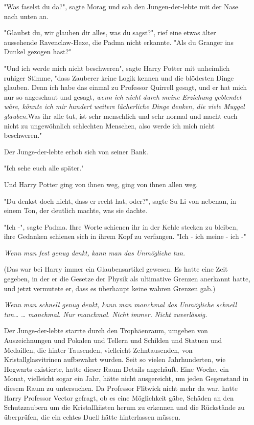 {"Was faselst du da?", sagte Morag und sah den Jungen-der-lebte mit der Nase nach unten an.

"Glaubst du, wir glauben dir alles, was du sagst?", rief eine etwas älter aussehende Ravenclaw-Hexe, die Padma nicht erkannte. "Als du Granger ins Dunkel gezogen hast?"

"Und ich werde mich nicht beschweren", sagte Harry Potter mit unheimlich ruhiger Stimme, "dass Zauberer keine Logik kennen und die blödesten Dinge glauben. Denn ich habe das einmal zu Professor Quirrell gesagt, und er hat mich nur so angeschaut und gesagt, \emph{wenn ich nicht durch meine Erziehung geblendet wäre, könnte ich mir hundert weitere lächerliche Dinge denken, die viele Muggel glauben.}Was ihr alle tut, ist sehr menschlich und sehr normal und macht euch nicht zu ungewöhnlich schlechten Menschen, also werde ich mich nicht beschweren."

Der Junge-der-lebte erhob sich von seiner Bank.

"Ich sehe euch alle später."

Und Harry Potter ging von ihnen weg, ging von ihnen allen weg.

"Du denkst doch nicht, dass er recht hat, oder?", sagte Su Li von nebenan, in einem Ton, der deutlich machte, was sie dachte.

"Ich -", sagte Padma. Ihre Worte schienen ihr in der Kehle stecken zu bleiben, ihre Gedanken schienen sich in ihrem Kopf zu verfangen. "Ich - ich meine - ich -"

\emph{Wenn man fest genug denkt, kann man das Unmögliche tun.}

(Das war bei Harry immer ein Glaubensartikel gewesen. Es hatte eine Zeit gegeben, in der er die Gesetze der Physik als ultimative Grenzen anerkannt hatte, und jetzt vermutete er, dass es überhaupt keine wahren Grenzen gab.)

\emph{Wenn man schnell genug denkt, kann man manchmal das Unmögliche schnell tun… … manchmal. Nur manchmal. Nicht immer. Nicht zuverlässig.}

Der Junge-der-lebte starrte durch den Trophäenraum, umgeben von Auszeichnungen und Pokalen und Tellern und Schilden und Statuen und Medaillen, die hinter Tausenden, vielleicht Zehntausenden, von Kristallglasvitrinen aufbewahrt wurden. Seit so vielen Jahrhunderten, wie Hogwarts existierte, hatte dieser Raum Details angehäuft. Eine Woche, ein Monat, vielleicht sogar ein Jahr, hätte nicht ausgereicht, um jeden Gegenstand in diesem Raum zu untersuchen. Da Professor Flitwick nicht mehr da war, hatte Harry Professor Vector gefragt, ob es eine Möglichkeit gäbe, Schäden an den Schutzzaubern um die Kristallkästen herum zu erkennen und die Rückstände zu überprüfen, die ein echtes Duell hätte hinterlassen müssen.

}
